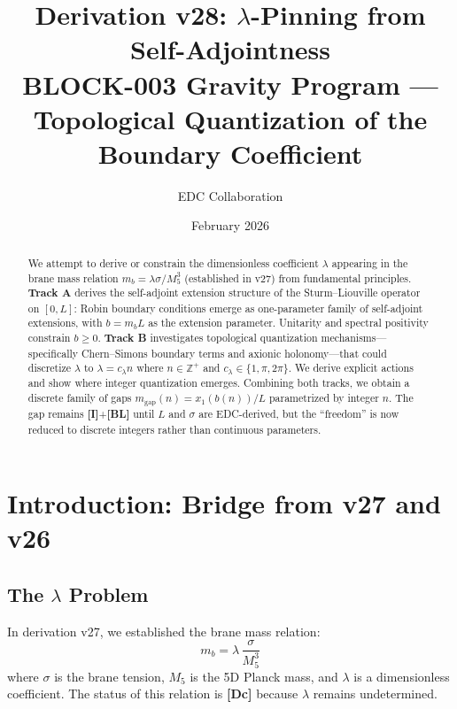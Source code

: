 \documentclass[11pt,a4paper]{article}
\newcommand{\Mfive}{M_5}
\newcommand{\mgap}{m_{\mathrm{gap}}}
\newcommand{\mb}{m_b}
\newcommand{\tagDc}{\textbf{[Dc]}}
\newcommand{\tagI}{\textbf{[I]}}
\newcommand{\tagBL}{\textbf{[BL]}}
\theoremstyle{definition}
\theoremstyle{plain}
\theoremstyle{remark}
\begin{document}
\title{\textbf{Derivation v28: $\lambda$-Pinning from Self-Adjointness}\\[0.5em]
\large BLOCK-003 Gravity Program --- Topological Quantization of the Boundary Coefficient}
\author{EDC Collaboration}
\date{February 2026}
\maketitle

\begin{abstract}
We attempt to derive or constrain the dimensionless coefficient $\lambda$ appearing in the
brane mass relation $\mb = \lambda\sigma/\Mfive^3$ (established in v27) from fundamental
principles. \textbf{Track A} derives the self-adjoint extension structure of the Sturm--Liouville
operator on $[0,L]$: Robin boundary conditions emerge as one-parameter family of self-adjoint
extensions, with $b = \mb L$ as the extension parameter. Unitarity and spectral positivity
constrain $b \geq 0$. \textbf{Track B} investigates topological quantization mechanisms---specifically
Chern--Simons boundary terms and axionic holonomy---that could discretize $\lambda$ to
$\lambda = c_\lambda n$ where $n \in \mathbb{Z}^+$ and $c_\lambda \in \{1, \pi, 2\pi\}$.
We derive explicit actions and show where integer quantization emerges. Combining both tracks,
we obtain a discrete family of gaps $\mgap(n) = x_1(b(n))/L$ parametrized by integer $n$.
The gap remains \tagI{}+\tagBL{} until $L$ and $\sigma$ are EDC-derived, but the ``freedom''
is now reduced to discrete integers rather than continuous parameters.
\end{abstract}

\tableofcontents
\newpage

\section{Introduction: Bridge from v27 and v26}
\label{sec:intro}

\subsection{The $\lambda$ Problem}

In derivation v27, we established the brane mass relation:
\begin{equation}
\mb = \lambda \, \frac{\sigma}{\Mfive^3}
\label{eq:mb-lambda}
\end{equation}
where $\sigma$ is the brane tension, $\Mfive$ is the 5D Planck mass, and $\lambda$ is a
dimensionless coefficient. The status of this relation is \tagDc{} because $\lambda$
remains undetermined.
\end{document}
